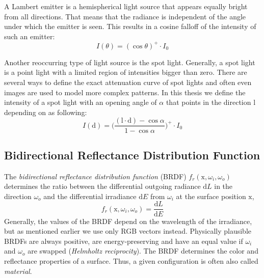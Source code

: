 \documentclass[thesis.tex]{subfiles}
\begin{document}
A Lambert emitter is a hemispherical light source that appears equally bright from all directions.
That means that the radiance is independent of the angle under which the emitter is seen.
This results in a cosine falloff of the intensity of such an emitter:
\begin{equation}
I(\theta) = (\cos\theta)^+ \cdot I_0
\end{equation}

Another reoccurring type of light source is the spot light.
Generally, a spot light is a point light with a limited region of intensities bigger than zero.
There are several ways to define the exact attenuation curve of spot lights and often even images are used to model more complex patterns.
In this thesis we define the intensity of a spot light with an opening angle of $\alpha$ that points in the direction $\mathrm{l}$ depending on as following:
\begin{equation}
I(\mathrm{d}) = \Big(\frac{(\mathrm{l} \cdot \mathrm{d}) - \cos\alpha }{1-\cos\alpha}\Big)^+ \cdot I_0
\end{equation}

\subsection{Bidirectional Reflectance Distribution Function}\label{sec:preq:brdf}
The \emph{bidirectional reflectance distribution function} (BRDF) $f_r(\mathrm{x}, \omega_i, \omega_o)$ determines the ratio between the differential outgoing radiance $\mathrm{d}L$ in the direction $\omega_o$ and the differential irradiance $\mathrm{d}E$ from $\omega_i$ at the surface position $\mathrm{x}$,
\begin{equation}
f_r(\mathrm{x}, \omega_i, \omega_o) = \frac{\mathrm{d}L}{\mathrm{d}E}
\end{equation}
Generally, the values of the BRDF depend on the wavelength of the irradiance, but as mentioned earlier we use only RGB vectors instead.
Physically plausible BRDFs are always positive, are energy-preserving and have an equal value if $\omega_i$ and $\omega_o$ are swapped (\emph{Helmholtz reciprocity}).
The BRDF determines the color and reflectance properties of a surface.
Thus, a given configuration is often also called \emph{material}.
\end{document}
